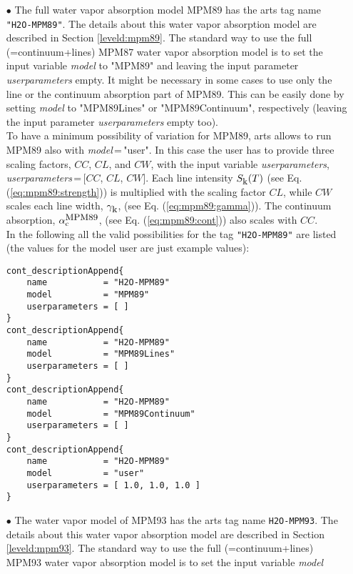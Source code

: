 \begin{itemize}
\item[$\bullet$] The full water vapor absorption model MPM89 \citep{liebe:89} 
     has the arts tag name {\tt "H2O-MPM89"}. The details about 
     this water vapor absorption model are described in 
     Section \ref{leveld:mpm89}.
     The standard way to use the full (=continuum+lines) MPM87 water 
     vapor absorption model is to set the input variable {\it model} 
     to "MPM89" and leaving the input parameter {\it userparameters} empty. 
     It might be necessary in some cases to use only the line or the 
     continuum absorption part of MPM89. This can be easily done 
     by setting {\it model} to "MPM89Lines" or "MPM89Continuum", 
     respectively (leaving the input parameter {\it userparameters} 
     empty too).\\ To have a minimum possibility of variation for MPM89, 
     arts allows to run MPM89 also with {\it model}\,=\,"user". 
     In this case the user has to provide three scaling factors,  
     $CC$, $CL$, and $CW$, with the input variable {\it userparameters}, 
     {\it userparameters}\,=\,$[$$CC$, $CL$, $CW$$]$. 
     Each line intensity $S_{\mbox{\rm \small k}}(T)$ (see Eq. (\ref{eq:mpm89:strength})) 
     is multiplied with the scaling factor $CL$, while $CW$ scales 
     each line width, $\gamma_{\mbox{\rm \small k}}$, (see Eq. (\ref{eq:mpm89:gamma})). 
     The continuum absorption, $\alpha^{\mbox{\rm \small MPM89}}_{\rm c}$, 
     (see Eq. (\ref{eq:mpm89:cont})) also scales with $CC$.\\
     In the following all the valid possibilities for the
     tag {\tt "H2O-MPM89"} are listed (the values for the 
     model user are just example values): 
\begin{lstlisting}
cont_descriptionAppend{
    name           = "H2O-MPM89"
    model          = "MPM89"
    userparameters = [ ]
}
cont_descriptionAppend{
    name           = "H2O-MPM89"
    model          = "MPM89Lines"
    userparameters = [ ]
}
cont_descriptionAppend{
    name           = "H2O-MPM89"
    model          = "MPM89Continuum"
    userparameters = [ ]
}
cont_descriptionAppend{
    name           = "H2O-MPM89"
    model          = "user"
    userparameters = [ 1.0, 1.0, 1.0 ]
}
\end{lstlisting}
\item[$\bullet$] The water vapor model of MPM93 \citep{liebeetal:93}
     has the arts tag name {\tt H2O-MPM93}. The details about this water vapor 
     absorption model are described in Section \ref{leveld:mpm93}.
     The standard way to use the full (=continuum+lines) MPM93 water 
     vapor absorption model is to set the input variable {\it model} 

\end{itemize}
